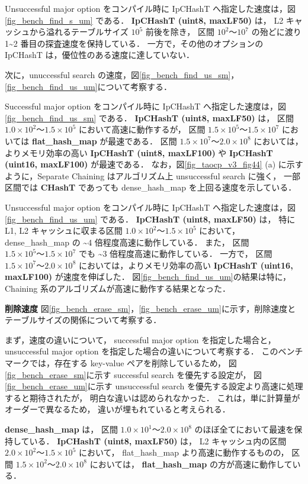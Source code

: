Unsuccessful major option をコンパイル時に IpCHashT へ指定した速度は，図\ref{fig_bench_find_s_um} である．
{\bf IpCHashT (uint8, maxLF50)} は，
L2 キャッシュから溢れるテーブルサイズ $10^5$ 前後を除き，
区間 $10^2〜10^7$ の殆どに渡り 1\textasciitilde 2 番目の探査速度を保持している．
一方で，その他のオプションの IpCHashT は，優位性のある速度に達していない．

次に，unuccessful search の速度，図\ref{fig_bench_find_us_sm}，\ref{fig_bench_find_us_um}について考察する．

Successful major option をコンパイル時に IpCHashT へ指定した速度は，図\ref{fig_bench_find_us_sm} である．
{\bf IpCHashT (uint8, maxLF50)} は，
区間 $1.0\times10^2〜1.5\times10^5$ において高速に動作するが，
区間 $1.5\times10^5〜1.5\times10^7$ においては {\bf flat\_hash\_map} が最速である．
区間 $1.5\times10^7〜2.0\times10^8$ においては，よりメモリ効率の高い
{\bf IpCHashT (uint8, maxLF100)} や {\bf IpCHashT (uint16, maxLF100)} が最速である．
なお，図\ref{fig_taocp_v3_fig44} (a) に示すように，Separate Chaining はアルゴリズム上 unsuccessful search に強く，
一部区間では {\bf CHashT} であっても dense\_hash\_map を上回る速度を示している．

Unsuccessful major option をコンパイル時に IpCHashT へ指定した速度は，図\ref{fig_bench_find_us_um} である．
{\bf IpCHashT (uint8, maxLF50)} は，
特に L1, L2 キャッシュに収まる区間 $1.0\times10^2〜1.5\times10^5$ において，
dense\_hash\_map の \textasciitilde4 倍程度高速に動作している．
また，
区間 $1.5\times10^5〜1.5\times10^7$ でも \textasciitilde3 倍程度高速に動作している．
一方で，
区間 $1.5\times10^7〜2.0\times10^8$ においては，よりメモリ効率の高い {\bf IpCHashT (uint16, maxLF100)} が速度を伸ばした．
図\ref{fig_bench_find_us_um}の結果は特に，Chaining 系のアルゴリズムが高速に動作する結果となった．
\leavevmode \newline

%
{\bf 削除速度}
\samepage\newline\indent
図\ref{fig_bench_erase_sm}，\ref{fig_bench_erase_um}に示す，削除速度とテーブルサイズの関係について考察する．

まず，速度の違いについて，
successful major option を指定した場合と，
unsuccessful major option を指定した場合の違いについて考察する．
このベンチマークでは，存在する key-value ペアを削除しているため，
図\ref{fig_bench_erase_sm}に示す successful search を優先する設定が，
図\ref{fig_bench_erase_um}に示す unsuccessful search を優先する設定より高速に処理すると期待されたが，
明白な違いは認められなかった．
これは，単に計算量がオーダーで異なるため，
違いが埋もれていると考えられる．

{\bf dense\_hash\_map} は，
区間 $1.0\times10^1〜2.0\times10^8$ のほぼ全てにおいて最速を保持している．
{\bf IpCHashT (uint8, maxLF50)} は，
L2 キャッシュ内の区間 $2.0\times10^2〜1.5\times10^5$ において，
flat\_hash\_map より高速に動作するものの，
区間 $1.5\times10^2〜2.0\times10^8$ においては，
{\bf flat\_hash\_map} の方が高速に動作している．


